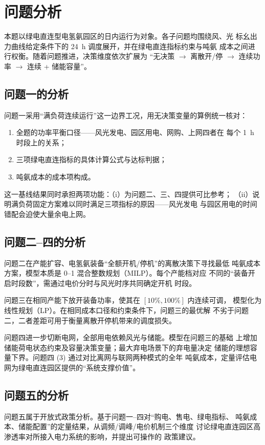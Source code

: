 \section{问题分析}

本题以绿电直连型电氢氨园区的日内运行为对象。各子问题均围绕风、光
标幺出力曲线给定条件下的 24~h 调度展开，并在绿电直连指标约束与吨氨
成本之间进行权衡。随着问题推进，决策维度依次扩展为
``无决策 $\to$ 离散开/停 $\to$ 连续功率 $\to$ 连续 + 储能容量''。

\subsection{问题一的分析}

问题一采用``满负荷连续运行''这一边界工况，用无决策变量的算例统一核对：
\begin{enumerate}[label=(\arabic*)]
  \item 全题的功率平衡口径——风光发电、园区用电、网购、上网四者在
        每个 1~h 时段上的关系；
  \item 三项绿电直连指标的具体计算公式与达标判据；
  \item 吨氨成本的成本项构成。
\end{enumerate}
这一基线结果同时承担两项功能：（i）为问题二、三、四提供可比参考；
（ii）说明满负荷固定方案难以同时满足三项指标的原因——风光发电
与园区用电的时间错配会迫使大量余电上网。

\subsection{问题二--四的分析}

问题二在产能扩容、电氢氨装备``全额开机/停机''的离散决策下寻找最低
吨氨成本方案，模型本质是 0--1 混合整数规划（MILP）。每个产能档对应
不同的``装备开启时段数''，需通过电价分时与风光时序共同确定开机
时段。

问题三在相同产能下放开装备功率，使其在 $[10\%, 100\%]$ 内连续可调，
模型化为线性规划（LP）。在相同成本口径和约束条件下，问题三的最优解
不劣于问题二，二者差距可用于衡量离散开停机带来的调度损失。

问题四进一步切断电网，全部用电依赖风光与储能。模型在问题三的基础
上增加储能荷电状态约束及容量决策变量；最大弃电场景下的弃电量决定
储能的理想容量下界。问题四 (3) 通过对比离网与联网两种模式的全年
吨氨成本，定量评估电网为绿电直连园区提供的``系统支撑价值''。

\subsection{问题五的分析}

问题五属于开放式政策分析。基于问题一--四对``购电、售电、绿电指标、
吨氨成本、储能配置''的定量结果，从调频/调峰/电价机制三个维度
讨论绿电直连园区高渗透率对所接入电力系统的影响，并提出可操作的
政策建议。
